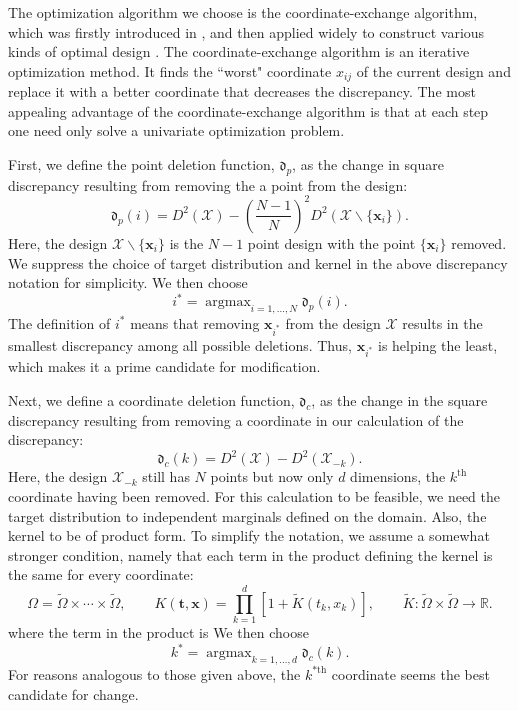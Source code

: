 \documentclass[graybox]{svmult}
\newcommand{\reals}{\mathbb{R}}
\newcommand{\vx}{\boldsymbol{x}}
\newcommand{\vt}{\boldsymbol{t}}
\DeclareMathOperator*{\argmax}{argmax}
\newcommand{\Xdes}{\mathcal{X}}
\newcommand{\frakd}{\mathfrak{d}}
\newcommand{\tK}{\widetilde{K}}
\newcommand{\tOmega}{\widetilde{\Omega}}
\begin{document}
The optimization algorithm we choose is the coordinate-exchange algorithm, which was firstly introduced in \cite{meyer1995coordinate}, and then applied widely to construct various kinds of optimal design \cite{sambo2014coordinate,overstall2017bayesian,kang2018stochastic}. 
The coordinate-exchange algorithm is an iterative optimization method.
It finds the ``worst" coordinate $x_{ij}$ of the current design and replace it with a better coordinate that decreases the discrepancy. 
The most appealing advantage of the coordinate-exchange algorithm is that at each step one need only solve a univariate optimization problem.

First, we define the point deletion function, $\frakd_p$, as the change in square discrepancy resulting from removing the a point from the design:
\begin{equation}\label{eq:rowdeletion}
\frakd_p(i) = D^2(\Xdes)-\left(\frac{N-1}{N}\right)^2 D^2(\Xdes\backslash \{\vx_i\}).
\end{equation}
Here, the design $\Xdes\backslash \{\vx_i\}$ is the $N-1$ point design with the point $\{\vx_i\}$ removed. We suppress the choice of target distribution and kernel in the above discrepancy notation for simplicity. We then choose 
\begin{equation} \label{eq:rowchoice}
    i^*=\argmax_{i=1,\ldots,N} \frakd_p(i).
\end{equation}
The definition of $i^*$ means that removing $\vx_{i^*}$ from the design $\Xdes$ results in the smallest discrepancy among all possible deletions.  Thus, $\vx_{i^*}$ is helping the least, which makes it a prime candidate for modification.

Next, we define a coordinate deletion function, $\frakd_{c}$, as the change in the square discrepancy resulting from removing a coordinate in our calculation of the discrepancy:
\begin{equation}\label{eq:coorddeletion}
\frakd_c(k) = D^2(\Xdes)-D^2(\Xdes_{-k}).
\end{equation}
Here, the design $\Xdes_{-k}$ still has $N$ points but now only $d$ dimensions, the $k^{\text{th}}$ coordinate having been removed.  For this calculation to be feasible, we need the target distribution to independent marginals defined on the domain.  Also, the kernel to be of product form.  To simplify the notation, we assume a somewhat stronger condition, namely that each term in the product defining the kernel is the same for every coordinate:
\begin{equation}
    \label{eq:prodkernel}
    \Omega = \tOmega \times \cdots \times \tOmega, \qquad K(\vt,\vx) = \prod_{k=1}^d [1+ \tK(t_k,x_k)], \qquad \tK:\tOmega \times \tOmega \to \reals.
\end{equation}
where the term in the product is 
We then choose 
\begin{equation} \label{eq:rowchoice}
    k^*=\argmax_{k=1, \ldots, d} \frakd_c(k).
\end{equation}
For reasons analogous to those given above, the $k^{*\text{th}}$ coordinate seems the best candidate for change.
\end{document}
